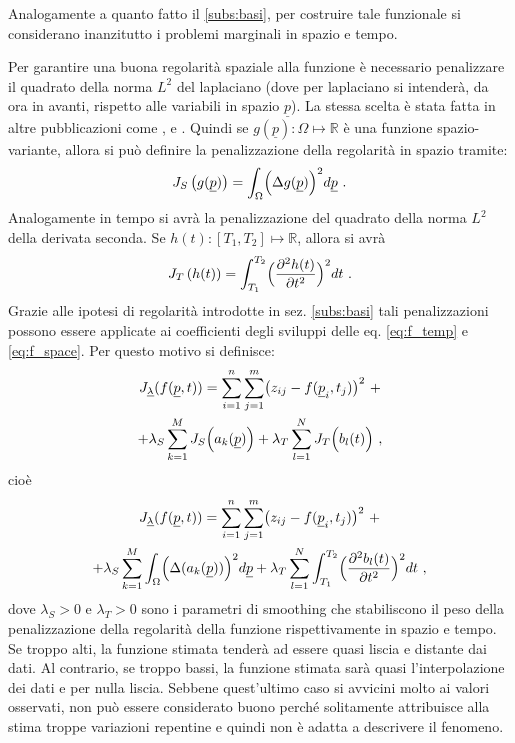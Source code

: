 \documentclass[a4paper,11pt,twoside,openright]{book}							%
\begin{document}
Analogamente a quanto fatto il \ref{subs:basi}, per costruire tale funzionale si considerano inanzitutto i problemi marginali in spazio e tempo.

Per garantire una buona regolarità spaziale alla funzione è necessario penalizzare il quadrato della norma $L^2$ del laplaciano (dove per laplaciano si intenderà, da ora in avanti, rispetto alle variabili in spazio $\underline p$). La stessa scelta è stata fatta in altre pubblicazioni come \cite{art:ramsay}, \cite{art:sangalli} e \cite{art:wood}. Quindi se $g(\underline p): \Omega \mapsto \mathbb{R}$ è una funzione spazio-variante, allora si può definire la penalizzazione della regolarità in spazio tramite:
$$
J_S\left(g(\underline p)\right)=\int_{\Omega} \Bigl( \Delta  g(\underline p  ) \Bigr)^2 d \underline p \ .
$$
Analogamente in tempo si avrà la penalizzazione del quadrato della norma $L^2$ della derivata seconda. Se $h(t): [T_1,T_2] \mapsto \mathbb{R}$, allora si avrà
$$
J_T\left(h(t)\right)=\int_{T_1}^{T_2} \Bigl( \frac{\partial^2   h(t)   }{\partial t ^2} \Bigr)^2 dt\ .
$$
Grazie alle ipotesi di regolarità introdotte in sez. \ref{subs:basi} tali penalizzazioni possono essere applicate ai coefficienti degli sviluppi delle eq. \ref{eq:f_temp} e \ref{eq:f_space}. Per questo motivo si definisce:
\begin{multline*}
J_{\underline \lambda }(f(\underline p,t))=\sum_{i=1}^n \sum_{j=1}^m \bigl( z_{ij} - f(\underline p_i,t_j) \bigr)^2 \ + \\
+\lambda_S  \sum_{k=1}^M J_S\Bigl( a_k(\underline p)\Bigr) + \lambda_T \sum_{l=1}^N J_T \Bigl( b_l(t)\Bigr) \ ,
\end{multline*}
cioè
\begin{multline}
\label{eq:penalizzdisc}
J_{\underline \lambda }(f(\underline p,t))=\sum_{i=1}^n \sum_{j=1}^m \bigl( z_{ij} - f(\underline p_i,t_j) \bigr)^2 \ + \\
+\lambda_S  \sum_{k=1}^M \int_{\Omega} \Bigl( \Delta(  a_k(\underline p)  ) \Bigr)^2 d \underline p + \lambda_T \sum_{l=1}^N\int_{T_1}^{T_2} \Bigl( \frac{\partial^2   b_l(t)   }{\partial t ^2} \Bigr)^2 dt \ ,
\end{multline}
dove $\lambda_S>0$ e $\lambda_T>0$ sono i parametri di smoothing che stabiliscono il peso della penalizzazione della regolarità della funzione rispettivamente in spazio e tempo. Se troppo alti, la funzione stimata tenderà ad essere quasi liscia e distante dai dati. Al contrario, se troppo bassi, la funzione stimata sarà quasi l'interpolazione dei dati e per nulla liscia. Sebbene quest'ultimo caso si avvicini molto ai valori osservati, non può essere considerato buono perché solitamente attribuisce alla stima troppe variazioni repentine e quindi non è adatta a descrivere il fenomeno.
\end{document}
